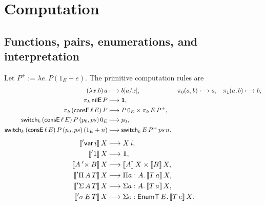 \section{Computation}
\subsection{Functions, pairs, enumerations, and interpretation}
Let $P^+:=\lambda e.\,P(1_E+e)$. The primitive computation rules are
\begin{align*}
(\lambda x.b)\,a&\longmapsto b[a/x],&
\pi_0(a,b)&\longmapsto a,&\pi_1(a,b)&\longmapsto b,\\
\pi_k\,\mathsf{nilE}\,P&\longmapsto\mathbf1,\\
\pi_k\,(\mathsf{consE}\,\ell\,E)\,P&\longmapsto P\,0_E\times\pi_k\,E\,P^+,\\
\mathsf{switch}_k\,(\mathsf{consE}\,\ell\,E)\,P\,(p_0,ps)\,0_E&\longmapsto p_0,\\
\mathsf{switch}_k\,(\mathsf{consE}\,\ell\,E)\,P\,(p_0,ps)\,(1_E+n)&\longmapsto\mathsf{switch}_k\,E\,P^+\,ps\,n.
\end{align*}
\begin{align*}
\llbracket \mathsf{'var}\,i\rrbracket\,X&\longmapsto X\,i,\\
\llbracket \mathsf{'1}\rrbracket\,X&\longmapsto\mathbf1,\\
\llbracket A\mathbin{'\times}B\rrbracket\,X&\longmapsto\llbracket A\rrbracket\,X\times\llbracket B\rrbracket\,X,\\
\llbracket '\Pi\,A\,T\rrbracket\,X&\longmapsto\Pi a:A.\,\llbracket T\,a\rrbracket\,X,\\
\llbracket '\Sigma\,A\,T\rrbracket\,X&\longmapsto\Sigma a:A.\,\llbracket T\,a\rrbracket\,X,\\
\llbracket '\sigma\,E\,T\rrbracket\,X&\longmapsto\Sigma e:\mathsf{EnumT}\,E.\,\llbracket T\,e\rrbracket\,X.
\end{align*}
